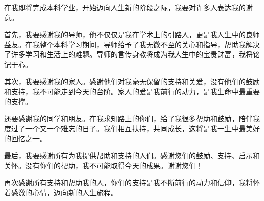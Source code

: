 
\begin{zhixie}
在我即将完成本科学业，开始迈向人生新的阶段之际，我要对许多人表达我的谢意。

首先，我要感谢我的导师，他不仅仅是我在学术上的引路人，更是我人生中的良师益友。在我整个本科学习期间，导师给予了我无微不至的关心和指导，帮助我解决了许多学习和生活上的难题。导师的言传身教将成为我人生中的宝贵财富，我将铭记于心。

其次，我要感谢我的家人。感谢他们对我毫无保留的支持和关爱，没有他们的鼓励和支持，我不可能走到今天的台阶。家人的爱是我前行的动力，是我生命中最重要的支撑。

还要感谢我的同学和朋友。在我求知路上的你们，给了我很多帮助和鼓励，陪伴我度过了一个又一个难忘的日子。我们相互扶持，共同成长，这将是我一生中最美好的回忆之一。

最后，我要感谢所有为我提供帮助和支持的人们。感谢您们的鼓励、支持、启示和关怀。没有你们的帮助，我不可能取得今天的成果。谢谢您们！

再次感谢所有支持和帮助我的人，你们的支持是我不断前行的动力和信仰，我将怀着感激的心情，迈向新的人生旅程。
\end{zhixie}
